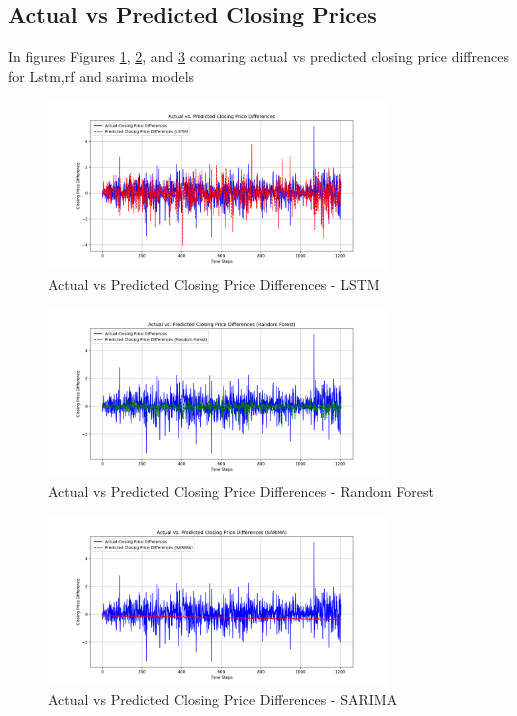 \subsection{Actual vs Predicted Closing Prices}
In figures Figures \ref{fig:lstm}, \ref{fig:rf}, and \ref{fig:sarima} comaring actual vs predicted closing price diffrences for Lstm,rf and sarima models 
\begin{figure}[h]
    \centering
    \includegraphics[width=0.8\textwidth]{./figures_amit/actual_vs_predicted.png}
    \caption{Actual vs Predicted Closing Price Differences - LSTM}
    \label{fig:lstm}
\end{figure}

\begin{figure}[h]
    \centering
    \includegraphics[width=0.8\textwidth]{./figures_amit/actual_vs_predicted_rf.png}
    \caption{Actual vs Predicted Closing Price Differences - Random Forest}
    \label{fig:rf}
\end{figure}

\begin{figure}[h]
    \centering
    \includegraphics[width=0.8\textwidth]{./figures_amit/actual_vs_predicted_sarima.png}
    \caption{Actual vs Predicted Closing Price Differences - SARIMA}
    \label{fig:sarima}
\end{figure}

